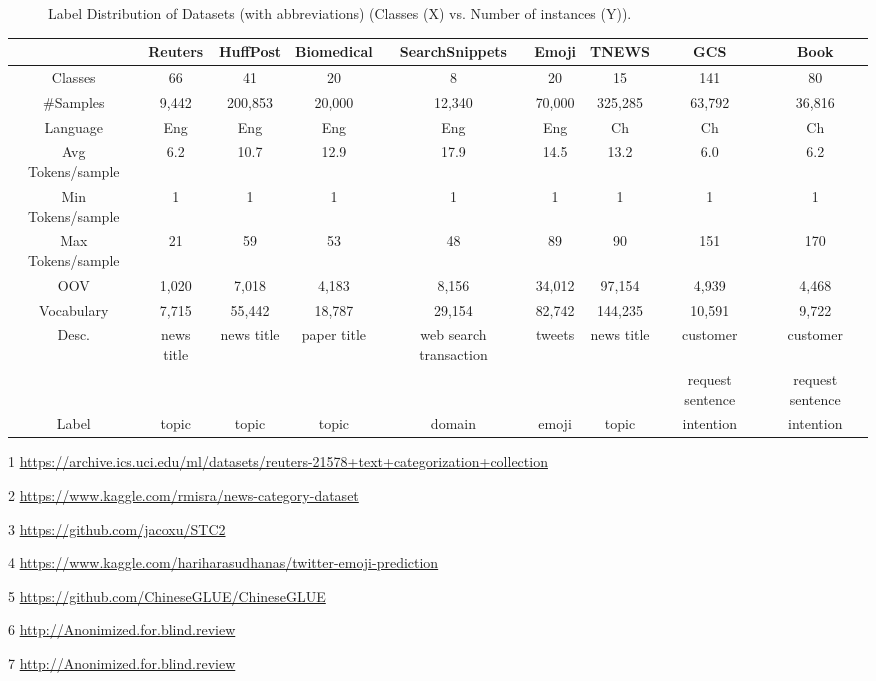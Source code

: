 \begin{figure}[th]
	\caption{Label Distribution of Datasets (with abbreviations) (Classes (X) vs. Number of 
instances (Y)). 
} 
\label{fig:distribution}
\end{figure}

\begin{table}[th]
	\centering
	\scriptsize
	\setlength{\abovecaptionskip}{0pt}
	\setlength{\belowcaptionskip}{0pt}
	\begin{threeparttable}
	\begin{tabular}{ccccccccc}
		\toprule
		& Reuters\tnote{1}  & HuffPost\tnote{2} & Biomedical\tnote{3}  & SearchSnippets\tnote{3} & Emoji\tnote{4}  & TNEWS \tnote{5}   & GCS\tnote{6}  & Book\tnote{7} \\ \hline
		Classes       & 66      & 41    &20&8  & 20 & 15         & 141                & 80    \\
		\#Samples     & 9,442   &200,853   &20,000&12,340    &70,000       & 325,285    & 63,792                &36,816      \\
		Language      & Eng      & Eng                  & Eng          & Eng    &Eng& Ch         & Ch   &Ch    \\
		Avg Tokens/sample & 6.2      &10.7    &12.9&17.9   &14.5    & 13.2        &     6.0      &6.2      \\
		Min Tokens/sample & 1 &1 & 1 & 1 &1&1         &1&1\\
		Max Tokens/sample & 21 &59 &53&48 &89 & 90 & 151    &170 \\
		OOV &1,020&7,018&4,183&8,156 &34,012 &97,154&4,939   &4,468\\
		Vocabulary& 7,715&55,442&18,787&29,154&82,742&144,235&10,591     &9,722\\
		Desc.         & news title  & news title &paper title&web search transaction &tweets &news title& customer  &customer
   \\ 
	& & &  & & &&request sentence &request sentence \\
		Label         & topic     & topic    &topic &domain  &emoji   & topic   & intention                      &intention\\
		\bottomrule              
	\end{tabular}

\begin{tablenotes}
	\item[1] \url{https://archive.ics.uci.edu/ml/datasets/reuters-21578+text+categorization+collection}
	\item[2] \url{https://www.kaggle.com/rmisra/news-category-dataset}
	\item[3] \url{https://github.com/jacoxu/STC2}
	\item[4] \url{https://www.kaggle.com/hariharasudhanas/twitter-emoji-prediction}
	\item[5] \url{https://github.com/ChineseGLUE/ChineseGLUE}
	\item[6] \url{http://Anonimized.for.blind.review}
	\item[7] \url{http://Anonimized.for.blind.review}
	

\end{tablenotes}
\end{threeparttable}
\end{table}
